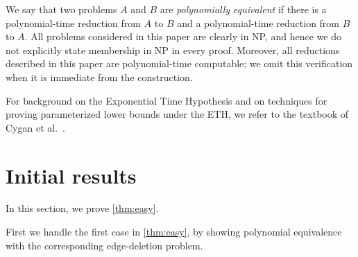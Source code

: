 \documentclass[a4paper,UKenglish,cleveref, autoref, thm-restate]{lipics-v2021}
\newcommand{\pname}[1]{\textnormal{\textsc{#1}}}
\newcommand{\HFD}{\pname{$H$-free Edge Deletion}}
\newcommand{\HFS}{\pname{$H$-free Subdivision}}
\begin{document}
We say that two problems $A$ and $B$ are \emph{polynomially equivalent} if there is a polynomial-time reduction from $A$ to $B$ and a polynomial-time reduction from $B$ to $A$.
All problems considered in this paper are clearly in NP, and hence we do not explicitly state membership in NP in every proof.
Moreover, all reductions described in this paper are polynomial-time computable; we omit this verification when it is immediate from the construction.

For background on the Exponential Time Hypothesis and on techniques for proving parameterized lower bounds under the ETH, we refer to the textbook of Cygan et al.~\cite{cygan2015parameterized}.
%
\section{Initial results}
\label{sec:initial-results}

In this section, we prove \cref{thm:easy}.

\EasyTheorem*

First we handle the first case in \cref{thm:easy}, by showing polynomial
equivalence with the corresponding edge-deletion problem.
\end{document}
